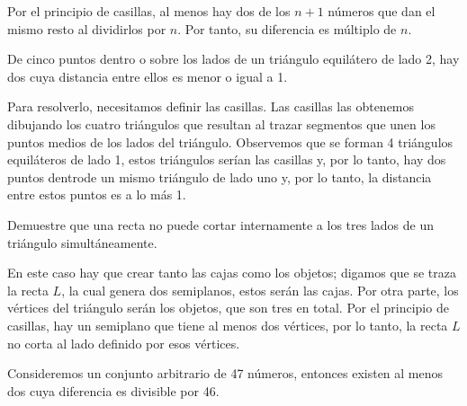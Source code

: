 \begin{solucion}
    Por el principio de casillas, al menos hay dos de los $n+1$ números que dan el mismo resto al dividirlos por $n$.  Por tanto, su diferencia es múltiplo de $n$.
\end{solucion}

\begin{ejemplo}
    De cinco puntos dentro o sobre los lados de un triángulo equilátero de lado 2, hay dos cuya distancia entre ellos es menor o igual a 1.
\end{ejemplo}

\begin{solucion}
    Para resolverlo, necesitamos definir las casillas.  Las casillas las obtenemos dibujando los cuatro triángulos que resultan al trazar segmentos que unen los puntos medios de los lados del triángulo. Observemos que se forman 4 triángulos equiláteros de lado 1, estos triángulos serían las casillas y, por lo tanto, hay dos puntos dentrode un mismo triángulo de lado uno y, por lo tanto, la distancia entre estos puntos es a lo más 1.
\end{solucion}

\begin{ejemplo}
    Demuestre que una recta no puede cortar internamente a los tres lados de un triángulo simultáneamente.
\end{ejemplo}

\begin{solucion}
    En este caso hay que crear tanto las cajas como los objetos; digamos que se traza la recta $L$, la cual genera dos semiplanos, estos serán las cajas. Por otra parte, los vértices del triángulo serán los objetos, que son tres en total.  Por el principio de casillas, hay un semiplano que tiene al menos dos vértices, por lo tanto, la recta $L$ no corta al lado definido por esos vértices.
\end{solucion}

\begin{ejemplo}
    Consideremos un conjunto arbitrario de 47 números, entonces existen al menos dos cuya diferencia es divisible por 46.
\end{ejemplo}

